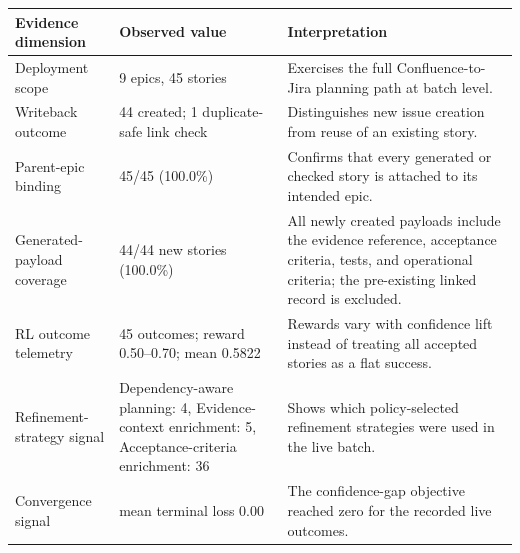 \begin{tabularx}{\textwidth}{@{}p{}p{}X@{}}
\toprule
Evidence dimension & Observed value & Interpretation \\
\midrule
Deployment scope & 9 epics, 45 stories & Exercises the full Confluence-to-Jira planning path at batch level. \\
Writeback outcome & 44 created; 1 duplicate-safe link check & Distinguishes new issue creation from reuse of an existing story. \\
Parent-epic binding & 45/45 (100.0\%) & Confirms that every generated or checked story is attached to its intended epic. \\
Generated-payload coverage & 44/44 new stories (100.0\%) & All newly created payloads include the evidence reference, acceptance criteria, tests, and operational criteria; the pre-existing linked record is excluded. \\
RL outcome telemetry & 45 outcomes; reward 0.50--0.70; mean 0.5822 & Rewards vary with confidence lift instead of treating all accepted stories as a flat success. \\
Refinement-strategy signal & Dependency-aware planning: 4, Evidence-context enrichment: 5, Acceptance-criteria enrichment: 36 & Shows which policy-selected refinement strategies were used in the live batch. \\
Convergence signal & mean terminal loss 0.00 & The confidence-gap objective reached zero for the recorded live outcomes. \\
\bottomrule
\end{tabularx}
